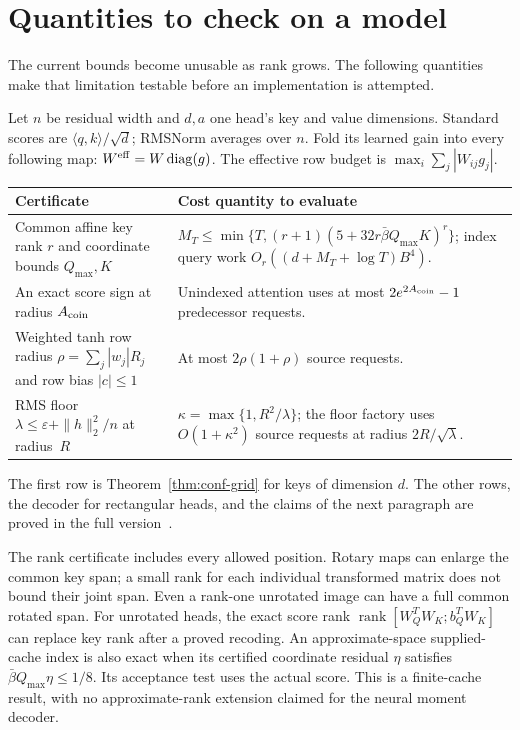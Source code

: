 \section{Quantities to check on a model}
\label{sec:checkpoint}

The current bounds become unusable as rank grows. The following
quantities make that limitation testable before an implementation
is attempted.

Let $n$ be residual width and $d,a$ one head's key and value
dimensions. Standard scores are $\langle q,k\rangle/\sqrt d$;
RMSNorm averages over $n$. Fold its learned gain into every
following map: $W^{\rm eff}=W\operatorname{diag}(g)$.
The effective row budget is $\max_i\sum_j|W_{ij}g_j|$.

\begin{center}
\small
\begin{tabularx}{\textwidth}{@{}>{\raggedright\arraybackslash}p{}Y@{}}
\toprule
Certificate & Cost quantity to evaluate\\
\midrule
Common affine key rank $r$ and coordinate bounds $Q_{\max},K$ &
$M_T\le\min\{T,(r+1)(5+32r\bar\beta Q_{\max}K)^r\}$;
index query work $O_r((d+M_T+\log T)B^4)$.\\
An exact score sign at radius $A_{\rm coin}$ &
Unindexed attention uses at most
$2e^{2A_{\rm coin}}-1$ predecessor requests.\\
Weighted tanh row radius $\rho=\sum_j|w_j|R_j$ and row bias $|c|\le1$ &
At most $2\rho(1+\rho)$ source requests.\\
RMS floor $\lambda\le\varepsilon+\|h\|_2^2/n$ at radius~$R$ &
$\kappa=\max\{1,R^2/\lambda\}$; the floor factory uses
$O(1+\kappa^2)$ source requests at radius $2R/\sqrt\lambda$.\\
\bottomrule
\end{tabularx}
\end{center}
The first row is Theorem~\ref{thm:conf-grid} for keys of dimension $d$.
The other rows, the decoder for rectangular heads, and the claims of
the next paragraph are proved in the full version~\cite{mausbergfull2026}.

The rank certificate includes every allowed position. Rotary
maps can enlarge the common key span; a small rank for each
individual transformed matrix does not bound their joint span.
Even a rank-one unrotated image can have a full common rotated span.
For unrotated heads, the exact score rank
$\operatorname{rank}[W_Q^TW_K;b_Q^TW_K]$
can replace key rank after a proved recoding.
An approximate-space supplied-cache index is also exact when its
certified coordinate residual $\eta$ satisfies
$\bar\beta Q_{\max}\eta\le1/8$. Its acceptance test uses the actual score.
This is a finite-cache result, with no approximate-rank extension
claimed for the neural moment decoder.

